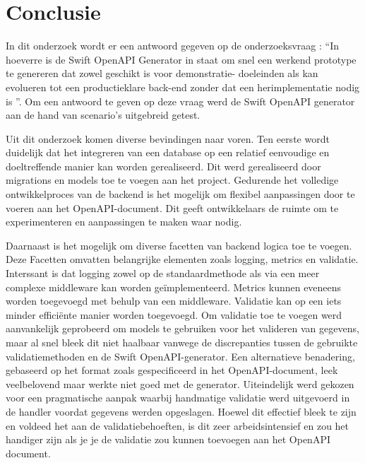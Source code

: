 
\chapter{Conclusie}%
\label{ch:conclusie}

In dit onderzoek wordt er een antwoord gegeven op de onderzoeksvraag : “In hoeverre is de Swift OpenAPI Generator in staat om snel een werkend prototype te genereren dat zowel geschikt is voor demonstratie- doeleinden als kan evolueren tot een productieklare back-end zonder dat een herimplementatie nodig is ”. Om een antwoord te geven op deze vraag werd de Swift OpenAPI generator aan de hand van scenario’s uitgebreid getest. 

Uit dit onderzoek komen diverse bevindingen naar voren. Ten eerste wordt duidelijk dat het integreren van een database op een relatief eenvoudige en doeltreffende manier kan worden gerealiseerd. Dit werd gerealiseerd door migrations en models toe te voegen aan het project. Gedurende het volledige ontwikkelproces van de backend is het mogelijk om flexibel aanpassingen door te voeren aan het OpenAPI-document. Dit geeft ontwikkelaars de ruimte om te experimenteren en aanpassingen te maken waar nodig. 

Daarnaast is het mogelijk om diverse facetten van backend logica toe te voegen. Deze Facetten omvatten belangrijke elementen zoals logging, metrics en validatie. Interssant is dat logging zowel op de standaardmethode als via een meer complexe middleware kan worden geïmplementeerd. Metrics kunnen eveneens worden toegevoegd met behulp van een middleware. Validatie kan op een iets minder efficiënte manier worden toegevoegd. 
Om validatie toe te voegen werd aanvankelijk geprobeerd om models te gebruiken voor het valideren van gegevens, maar al snel bleek dit niet haalbaar vanwege de discrepanties tussen de gebruikte validatiemethoden en de Swift OpenAPI-generator. Een alternatieve benadering, gebaseerd op het format zoals gespecificeerd in het OpenAPI-document, leek veelbelovend maar werkte niet goed met de generator. 
Uiteindelijk werd gekozen voor een pragmatische aanpak waarbij handmatige validatie werd uitgevoerd in de handler voordat gegevens werden opgeslagen. Hoewel dit effectief bleek te zijn en voldeed het aan de validatiebehoeften, is dit zeer arbeidsintensief en zou het handiger zijn als je je de validatie zou kunnen toevoegen aan het OpenAPI document. 

